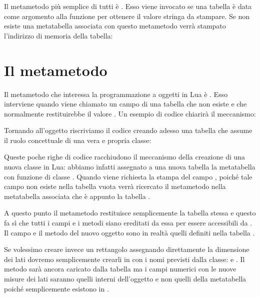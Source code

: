 Il metametodo più semplice di tutti è . Esso viene
invocato se una tabella è data come argomento alla funzione  per
ottenere il valore stringa da stampare. Se non esiste una metatabella
associata con questo metametodo verrà stampato l'indirizzo di memoria della
tabella:


\section{Il metametodo }
\label{secFondMetaIndex}

Il metametodo che interessa la programmazione a oggetti in Lua è
. Esso interviene quando viene chiamato un campo di una tabella
che non esiste e che normalmente restituirebbe il valore . Un esempio
di codice chiarirà il meccanismo:

Tornando all'oggetto  riscriviamo il codice creando adesso una
tabella che assume il ruolo concettuale di una vera e propria classe:

Queste poche righe di codice racchiudono il meccanismo della creazione di una
nuova classe in Lua: abbiamo infatti assegnato a una nuova tabella  la
metatabella con funzione di classe . Quando viene richiesta la
stampa del campo , poiché tale campo non esiste nella tabella vuota
 verrà ricercato il metametodo  nella metatabella
associata che è appunto la tabella .

A questo punto il metametodo restituisce semplicemente la tabella
 stessa e questo fa sì che tutti i campi e i metodi siano
ereditati da essa per essere accessibili da . Il campo  e il
metodo  del nuovo oggetto  sono in realtà quelli definiti nella
tabella .

Se volessimo creare invece un rettangolo assegnando direttamente la dimensione
dei lati dovremo semplicemente crearli in  con i nomi previsti dalla
classe:  e . Il metodo  sarà ancora caricato dalla
tabella  ma i campi numerici con le nuove misure dei lati
saranno quelli interni dell'oggetto  e non quelli della metatabella
poiché semplicemente esistono in .

